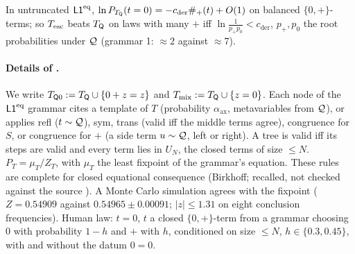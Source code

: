 \begin{conjecture}\label{conj:ident:cder}
In untruncated $\mathord{\mathsf{L1}}^{\mathrm{eq}}$, $\ln P_{T_{\mathsf{Q}}}(t=0)=-c_{\mathrm{der}}\#_+(t)+O(1)$ on balanced $\{0,+\}$-terms; so $T_{\mathrm{esc}}$ beats $T_{\mathsf{Q}}$ on laws with many $+$ iff $\ln\frac1{p_+p_0}<c_{\mathrm{der}}$, $p_+,p_0$ the root probabilities under $\mathcal{Q}$ (grammar 1: $\approx2$ against $\approx7$).
\end{conjecture}

\paragraph{Details of .} We write $T_{\mathsf{Q}0}:=T_{\mathsf{Q}}\cup\{0+z=z\}$ and $T_{\mathrm{mix}}:=T_{\mathsf{Q}}\cup\{z=0\}$. Each node of the $\mathord{\mathsf{L1}}^{\mathrm{eq}}$ grammar cites a template of $T$ (probability $\alpha_{\mathrm{ax}}$, metavariables from $\mathcal{Q}$), or applies refl ($t\sim\mathcal{Q}$), sym, trans (valid iff the middle terms agree), congruence for $S$, or congruence for $+$ (a side term $u\sim\mathcal{Q}$, left or right). A tree is valid iff its steps are valid and every term lies in $U_N$, the closed terms of size $\le N$. $P_T=\mu_T/Z_T$, with $\mu_T$ the least fixpoint of the grammar's equation. These rules are complete for closed equational consequence (Birkhoff; recalled, not checked against the source \citep{birkhoff1935structure}). A Monte Carlo simulation agrees with the fixpoint ($Z=0.54909$ against $0.54965\pm0.00091$; $|z|\le1.31$ on eight conclusion frequencies). Human law: $t=0$, $t$ a closed $\{0,+\}$-term from a grammar choosing $0$ with probability $1-h$ and $+$ with $h$, conditioned on size $\le N$, $h\in\{0.3,0.45\}$, with and without the datum $0=0$.

